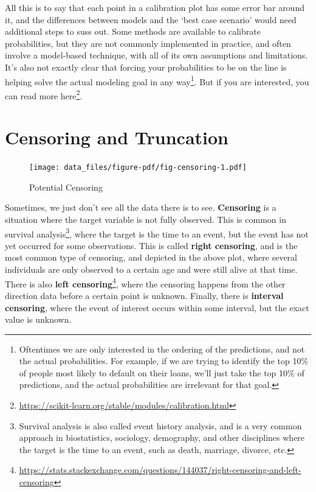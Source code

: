 \documentclass[
  letterpaper,
]{krantz}
\DeclareRobustCommand{\href}[2]{#2\footnote{\url{#1}}}
\begin{document}
All this is to say that each point in a calibration plot has some error
bar around it, and the differences between models and the `best case
scenario' would need additional steps to suss out. Some methods are
available to calibrate probabilities, but they are not commonly
implemented in practice, and often involve a model-based technique, with
all of its own assumptions and limitations. It's also not exactly clear
that forcing your probabilities to be on the line is helping solve the
actual modeling goal in any way\footnote{Oftentimes we are only
  interested in the ordering of the predictions, and not the actual
  probabilities. For example, if we are trying to identify the top 10\%
  of people most likely to default on their loans, we'll just take the
  top 10\% of predictions, and the actual probabilities are irrelevant
  for that goal.}. But if you are interested, you can read more
\href{https://scikit-learn.org/stable/modules/calibration.html}{here}.

\section{Censoring and Truncation}\label{sec-data-censoring}

\begin{figure}

{\centering \texttt{[image: data\_files/figure-pdf/fig-censoring-1.pdf]}

}

\caption{\label{fig-censoring}Potential Censoring}

\end{figure}

Sometimes, we just don't see all the data there is to see.
\textbf{Censoring} is a situation where the target variable is not fully
observed. This is common in survival analysis\footnote{Survival analysis
  is also called event history analysis, and is a very common approach
  in biostatistics, sociology, demography, and other disciplines where
  the target is the time to an event, such as death, marriage, divorce,
  etc.}, where the target is the time to an event, but the event has not
yet occurred for some observations. This is called \textbf{right
censoring}, and is the most common type of censoring, and depicted in
the above plot, where several individuals are only observed to a certain
age and were still alive at that time. There is also
\href{https://stats.stackexchange.com/questions/144037/right-censoring-and-left-censoring}{\textbf{left
censoring}}, where the censoring happens from the other direction data
before a certain point is unknown. Finally, there is \textbf{interval
censoring}, where the event of interest occurs within some interval, but
the exact value is unknown.
\end{document}
